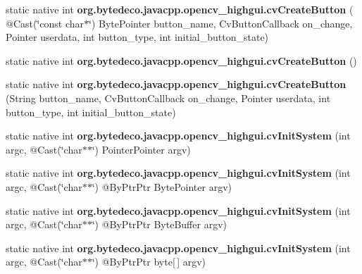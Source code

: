 \begin{DoxyCompactItemize}
\mbox{\label{group__highgui__c_ga73e273d0d4ec31c6a2d4ef8ce61397f3}} 
static native int {\bfseries org.\+bytedeco.\+javacpp.\+opencv\+\_\+highgui.\+cv\+Create\+Button} ( @Cast(\char`\"{}const char$\ast$\char`\"{}) Byte\+Pointer button\+\_\+name, Cv\+Button\+Callback on\+\_\+change, Pointer userdata, int button\+\_\+type, int initial\+\_\+button\+\_\+state)
\item 
\mbox{\label{group__highgui__c_gac66242744a776d09f12eaeeb0757d2b7}} 
static native int {\bfseries org.\+bytedeco.\+javacpp.\+opencv\+\_\+highgui.\+cv\+Create\+Button} ()
\item 
\mbox{\label{group__highgui__c_ga497b0df96ae9bf22df1bf306b75f4d23}} 
static native int {\bfseries org.\+bytedeco.\+javacpp.\+opencv\+\_\+highgui.\+cv\+Create\+Button} (String button\+\_\+name, Cv\+Button\+Callback on\+\_\+change, Pointer userdata, int button\+\_\+type, int initial\+\_\+button\+\_\+state)
\item 
\mbox{\label{group__highgui__c_ga4523687054a70aebe123cd03c77dc235}} 
static native int {\bfseries org.\+bytedeco.\+javacpp.\+opencv\+\_\+highgui.\+cv\+Init\+System} (int argc, @Cast(\char`\"{}char$\ast$$\ast$\char`\"{}) Pointer\+Pointer argv)
\item 
\mbox{\label{group__highgui__c_gaa4ffb74bfa38b577ea5fd5bc065c2a98}} 
static native int {\bfseries org.\+bytedeco.\+javacpp.\+opencv\+\_\+highgui.\+cv\+Init\+System} (int argc, @Cast(\char`\"{}char$\ast$$\ast$\char`\"{}) @By\+Ptr\+Ptr Byte\+Pointer argv)
\item 
\mbox{\label{group__highgui__c_gabc1ef3d3d806d5b441694f17e47b8995}} 
static native int {\bfseries org.\+bytedeco.\+javacpp.\+opencv\+\_\+highgui.\+cv\+Init\+System} (int argc, @Cast(\char`\"{}char$\ast$$\ast$\char`\"{}) @By\+Ptr\+Ptr Byte\+Buffer argv)
\item 
\mbox{\label{group__highgui__c_ga0ee3e1c652ddfe3be86ada6232bebc21}} 
static native int {\bfseries org.\+bytedeco.\+javacpp.\+opencv\+\_\+highgui.\+cv\+Init\+System} (int argc, @Cast(\char`\"{}char$\ast$$\ast$\char`\"{}) @By\+Ptr\+Ptr byte\mbox{[}$\,$\mbox{]} argv)
\item 

\end{DoxyCompactItemize}
